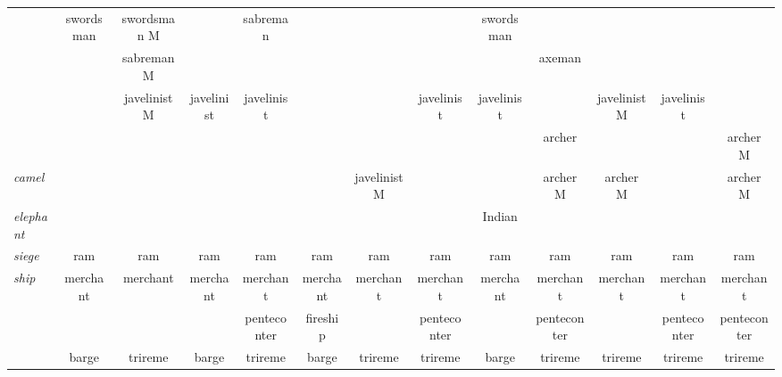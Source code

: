 \documentclass{article}
\begin{document}
\begin{landscape}
\begin{tabular}{l||c|c|c|c||c|c|c|c||c|c|c|c}
 & swordsman      & swordsman M    &                & sabreman       &                &                &                & swordsman      &                &                &                &                \\
 &                & sabreman M     &                &                &                &                &                &                & axeman         &                &                &                \\
 &                & javelinist M   & javelinist     & javelinist     &                &                & javelinist     & javelinist     &                & javelinist M   & javelinist     &                \\
 &                &                &                &                &                &                &                &                & archer         &                &                & archer M       \\
\hline\textit{camel}
 &                &                &                &                &                & javelinist M   &                &                & archer M       & archer M       &                & archer M       \\
\hline\textit{elephant}
 &                &                &                &                &                &                &                & Indian         &                &                &                &                \\
\hline\textit{siege} 
 & ram            & ram            & ram            & ram            & ram            & ram            & ram            & ram            & ram            & ram            & ram            & ram            \\
\hline\textit{ship}
 & merchant       & merchant       & merchant       & merchant       & merchant       & merchant       & merchant       & merchant       & merchant       & merchant       & merchant       & merchant       \\
 &                &                &                & penteconter    & fireship       &                & penteconter    &                & penteconter    &                & penteconter    & penteconter    \\
 & barge          & trireme        & barge          & trireme        & barge          & trireme        & trireme        & barge          & trireme        & trireme        & trireme        & trireme        \\


\end{tabular}
\end{landscape}
\end{document}
